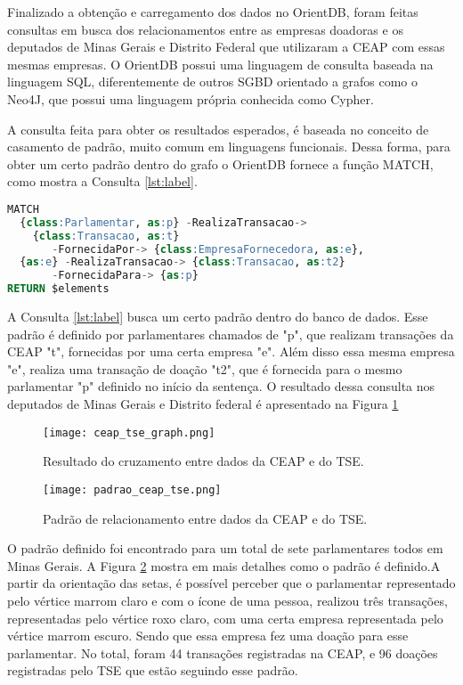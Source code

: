 Finalizado a obtenção e carregamento dos dados no OrientDB, foram feitas consultas em busca dos relacionamentos entre as empresas doadoras e os deputados de Minas Gerais e Distrito Federal que utilizaram a CEAP com essas mesmas empresas. O OrientDB possui uma linguagem de consulta baseada na linguagem SQL, diferentemente de outros SGBD orientado a grafos como o Neo4J, que possui uma linguagem própria conhecida como Cypher.
	
	A consulta feita para obter os resultados esperados, é baseada no conceito de casamento de padrão, muito comum em linguagens funcionais. Dessa forma, para obter um certo padrão dentro do grafo o OrientDB fornece a função MATCH, como mostra a Consulta \ref{lst:label}.

\begin{lstlisting}[label={lst:label}, caption={Consulta de relacionamento de doações entre deputados e empresas},captionpos=b, language=sql]
MATCH 
  {class:Parlamentar, as:p} -RealizaTransacao-> 
  	{class:Transacao, as:t} 
       -FornecidaPor-> {class:EmpresaFornecedora, as:e},
  {as:e} -RealizaTransacao-> {class:Transacao, as:t2} 
  	   -FornecidaPara-> {as:p}
RETURN $elements
\end{lstlisting}

A Consulta \ref{lst:label} busca um certo padrão dentro do banco de dados. Esse padrão é definido por parlamentares chamados de "p", que realizam transações da CEAP "t", fornecidas por uma certa empresa "e". Além disso essa mesma empresa "e", realiza uma transação de doação "t2", que é fornecida para o mesmo parlamentar "p" definido no início da sentença. O resultado dessa consulta nos deputados de Minas Gerais e Distrito federal é apresentado na Figura \ref{fig:ceap_tse_graph}

\begin{figure}[H]
\centering
\texttt{[image: ceap\_tse\_graph.png]}
\caption{Resultado do cruzamento entre dados da CEAP e do TSE.}
\label{fig:ceap_tse_graph}
\end{figure}

\begin{figure}[H]
\centering
\texttt{[image: padrao\_ceap\_tse.png]}
\caption{Padrão de relacionamento entre dados da CEAP e do TSE.}
\label{fig:padrao_ceap_tse}
\end{figure}

O padrão definido foi encontrado para um total de sete parlamentares todos em Minas Gerais. A Figura \ref{fig:padrao_ceap_tse} mostra em mais detalhes como o padrão é definido.A partir da orientação das setas, é possível perceber que o parlamentar representado pelo vértice marrom claro e com o ícone de uma pessoa, realizou três transações, representadas pelo vértice roxo claro, com uma certa empresa representada pelo vértice marrom escuro. Sendo que essa empresa fez uma doação para esse parlamentar. No total, foram 44 transações registradas na CEAP, e 96 doações registradas pelo TSE que estão seguindo esse padrão.

